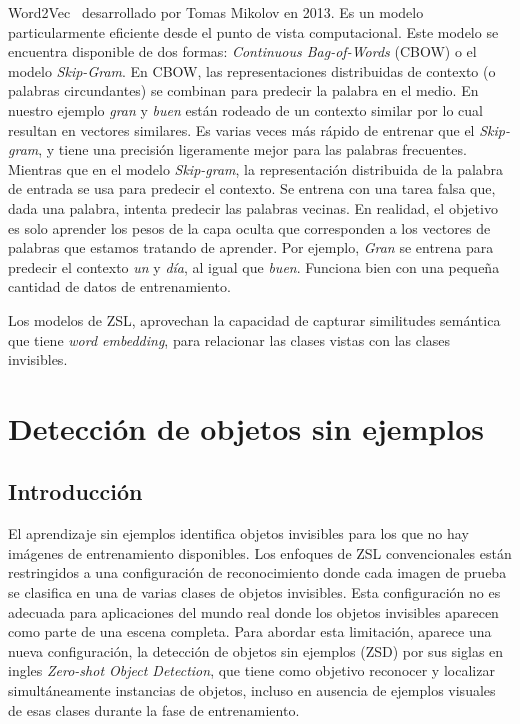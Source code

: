 Word2Vec~\cite{mikolov2013distributed} desarrollado por Tomas Mikolov en 2013. Es un modelo particularmente eficiente desde el punto de vista computacional. Este modelo se encuentra disponible de dos formas: \textit{Continuous Bag-of-Words} (CBOW) o el modelo \textit{Skip-Gram}. En CBOW, las representaciones distribuidas de contexto (o palabras circundantes) se combinan para predecir la palabra en el medio. En nuestro ejemplo \textit{gran} y \textit{buen} están rodeado de un contexto similar por lo cual resultan en vectores similares. Es varias veces más rápido de entrenar que el \textit{Skip-gram}, y tiene una precisión ligeramente mejor para las palabras frecuentes. Mientras que en el modelo \textit{Skip-gram}, la representación distribuida de la palabra de entrada se usa para predecir el contexto. Se entrena con una tarea falsa que, dada una palabra, intenta predecir las palabras vecinas. En realidad, el objetivo es solo aprender los pesos de la capa oculta que corresponden a los vectores de palabras que estamos tratando de aprender. Por ejemplo, \textit{Gran} se entrena para predecir el contexto \textit{un} y  \textit{día}, al igual que \textit{buen}. Funciona bien con una pequeña cantidad de datos de entrenamiento.

Los modelos de ZSL, aprovechan la capacidad de capturar similitudes semántica que tiene \textit{word embedding}, para relacionar las clases vistas con las clases invisibles.\\



\section{Detección de objetos sin ejemplos} \label{sec:detecciondeobjetossinejemplo}

\subsection{Introducción} 
El aprendizaje sin ejemplos identifica objetos invisibles para los que no hay imágenes de entrenamiento disponibles. Los enfoques de ZSL convencionales están restringidos a una configuración de reconocimiento donde cada imagen de prueba se clasifica en una de varias clases de objetos invisibles. Esta configuración no es adecuada para aplicaciones del mundo real donde los objetos invisibles aparecen como parte de una escena completa. Para abordar esta limitación, aparece una nueva configuración, la detección de objetos sin ejemplos (ZSD) por sus siglas en ingles \textit{Zero-shot Object Detection}, que tiene como objetivo reconocer y localizar simultáneamente instancias de objetos, incluso en ausencia de ejemplos visuales de esas clases durante la fase de entrenamiento.\\

